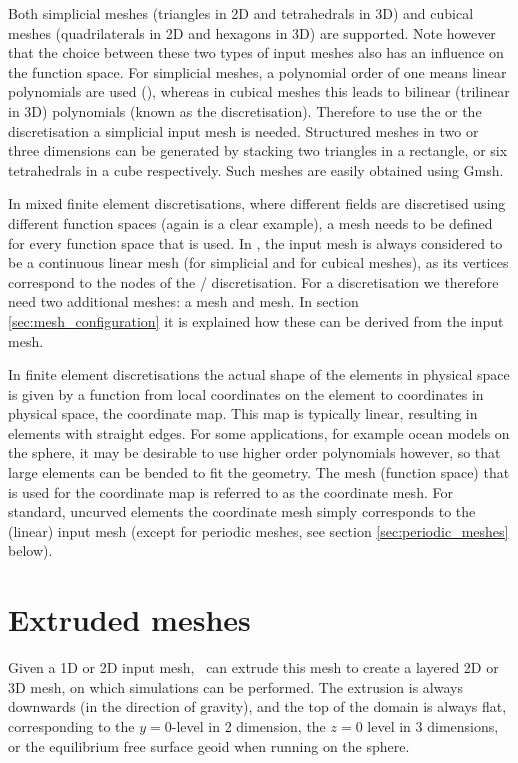 Both simplicial meshes (triangles in 2D and tetrahedrals in 3D) and cubical
meshes (quadrilaterals in 2D and hexagons in 3D) are supported. Note however
that the choice between these two types of input meshes also has an influence
on the function space. For simplicial meshes, a polynomial order
of one means linear polynomials are used (\Pone), whereas in cubical meshes this
leads to bilinear (trilinear in 3D) polynomials (known as the \Qone
discretisation). Therefore to use 
the \Poo or the \PoDGPt discretisation 
a simplicial input mesh is needed. Structured meshes in two
or three dimensions can be generated by stacking two triangles in a rectangle,
or six tetrahedrals in a cube respectively. Such meshes are easily obtained
using Gmsh.

In mixed finite element discretisations, where different fields are discretised
using different function spaces (again \PoDGPt is a clear example), a mesh needs
to be defined for every function space that is used. In \fluidity, 
the input mesh is always considered to be a 
continuous linear mesh (\Pone for simplicial and \Qone for
cubical meshes), as its vertices correspond to the nodes of the \Pone/\Qone
discretisation. For a \PoDGPt discretisation we therefore need two additional
meshes: a \PoDG mesh and \Ptwo mesh. In section \ref{sec:mesh_configuration} it
is explained how these can be derived from the input mesh.

In finite element discretisations the actual shape of the elements in physical
space is given by a function from local coordinates on the element to
coordinates in physical space, the coordinate map. This map is typically linear,
resulting in elements with straight edges. For some applications, for example
ocean models on the sphere, it may be desirable to use higher order
polynomials however, so that large elements can be bended to fit the
geometry. The mesh (function space) that is used for the coordinate map is
referred to as the coordinate mesh. For standard, uncurved elements 
the coordinate mesh simply corresponds to the (linear) input mesh
(except for periodic meshes, see section \ref{sec:periodic_meshes} below).

\section{Extruded meshes}
\label{sec:extruded_meshes}

Given a 1D or 2D input mesh, \fluidity\ can extrude this
mesh to create a layered 2D or 3D mesh, on which simulations can be
performed. The extrusion is always downwards (in the direction of gravity), 
and the top of the domain is always flat, corresponding to the $y=0$-level 
in 2 dimension, the $z=0$ level in 3 dimensions, or the equilibrium 
free surface geoid when running on the sphere.

